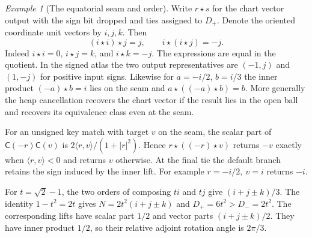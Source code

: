 \documentclass[11pt,reqno]{amsart}
\theoremstyle{definition}
\theoremstyle{remark}
\newtheorem{example}[theorem]{Example}
\numberwithin{equation}{section}
\newcommand{\ip}[2]{\langle #1,#2\rangle}
\newcommand{\Cay}{\mathsf{C}}
\begin{document}
\begin{example}[The equatorial seam and order]\label{m4:seams}
Write $r\star s$ for the chart vector output with the sign bit dropped and ties assigned to $D_+$. Denote the oriented coordinate unit vectors by $i,j,k$. Then
\[
 (i\star i)\star j=j,\qquad i\star(i\star j)=-j .
\]
Indeed $i\star i=0$, $i\star j=k$, and $i\star k=-j$. The expressions are equal in the quotient. In the signed atlas the two output representatives are $( -1,j)$ and $(1,-j)$ for positive input signs. Likewise for $a=-i/2$, $b=i/3$ the inner product $(-a)\star b=i$ lies on the seam and $a\star((-a)\star b)=b$. More generally the heap cancellation recovers the chart vector if the result lies in the open ball and recovers its equivalence class even at the seam.

For an unsigned key match with target $v$ on the seam, the scalar part of $\Cay(-r)\Cay(v)$ is $2\ip rv/(1+|r|^2)$. Hence $r\star((-r)\star v)$ returns $-v$ exactly when $\ip rv<0$ and returns $v$ otherwise. At the final tie the default branch retains the sign induced by the inner lift. For example $r=-i/2,\ v=i$ returns $-i$.

For $t=\sqrt2-1$, the two orders of composing $ti$ and $tj$ give $(i+j\pm k)/3$. The identity $1-t^2=2t$ gives $N=2t^2(i+j\pm k)$ and $D_+=6t^2>D_-=2t^2$. The corresponding lifts have scalar part $1/2$ and vector parts $(i+j\pm k)/2$. They have inner product $1/2$, so their relative adjoint rotation angle is $2\pi/3$.
\end{example}
\end{document}
